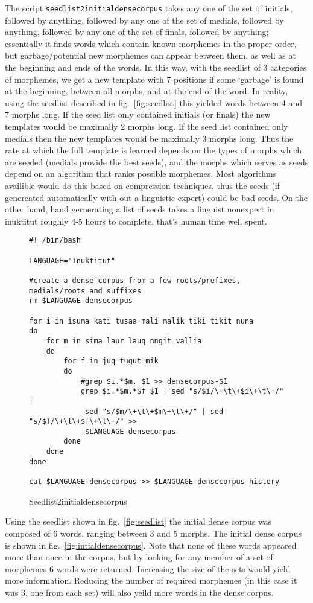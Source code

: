 \documentclass[runningheads,a4paper]{llncs}
\begin{document}
The script {\tt seedlist2initialdensecorpus} takes any one of the set of initials, followed by anything, followed by any one of the set of medials, followed by anything, followed by any one of the set of finals, followed by anything; essentially it finds words which contain known morphemes in the proper order, but garbage/potential new morphemes can appear between them, as well as at the beginning and ends of the words. In this way, with the seedlist of 3 categories of morphemes, we get a new template with 7 positions if some `garbage' is found at the beginning, between all morphs, and at the end of the word. In reality, using the seedlist described in fig.~\ref{fig:seedlist} this yielded words between 4 and 7 morphs long. If the seed list only contained initials (or finals) the new templates would be maximally 2 morphs long. If the seed list contained only medials then the new templates would be maximally 3 morphs long. Thus the rate at which the full template is learned depends on the types of morphs which are seeded (medials provide the best seeds), and the morphs which serves as seeds depend on an algorithm that ranks possible morphemes. Most algorithms availible would do this based on compression techniques, thus the seeds (if genereated automatically with out a linguistic expert) could be bad seeds. On the other hand, hand gernerating a list of seeds takes a linguist nonexpert in inuktitut roughly 4-5 hours to complete, that's human time well spent.

\begin{figure*}[p]
\begin{verbatim}	
#! /bin/bash

LANGUAGE="Inuktitut"
 
#create a dense corpus from a few roots/prefixes, medials/roots and suffixes
rm $LANGUAGE-densecorpus

for i in isuma kati tusaa mali malik tiki tikit nuna
do
	for m in sima laur lauq nngit vallia
	do
		for f in juq tugut mik
		do
			#grep $i.*$m. $1 >> densecorpus-$1
			grep $i.*$m.*$f $1 | sed "s/$i/\+\t\+$i\+\t\+/" | 
			 sed "s/$m/\+\t\+$m\+\t\+/" | sed "s/$f/\+\t\+$f\+\t\+/" >> 
			 $LANGUAGE-densecorpus
		done
	done
done

cat $LANGUAGE-densecorpus >> $LANGUAGE-densecorpus-history
\end{verbatim}
	\caption{Seedlist2initialdensecorpus}
	\label{fig:Seedlist2initialdensecorpus}
\end{figure*}

Using the seedlist shown in fig.~\ref{fig:seedlist} the initial dense corpus was composed of 6 words, ranging between 3 and 5 morphs. The initial dense corpus is shown in fig.~\ref{fig:intialdensecorpus}. Note that none of these words appeared more than once in the corpus, but by looking for any member of a set of morphemes 6 words were returned. Increasing the size of the sets would yield more information. Reducing the number of required morphemes (in this case it was 3, one from each set) will also yeild more words in the dense corpus.
\end{document}

